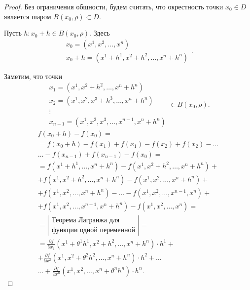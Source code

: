 \begin{proof}
    Без ограничения общности, будем считать, что окрестность точки $ x_0\in D $ является шаром $ B(x_0,\rho)\subset D $.

    Пусть $ h:x_0+h \in B(x_0,\rho) $. Здесь
    \[
        \begin{array}{l}
            x_0 = (x^1,x^2,\ldots,x^n) \\
            x_0 + h = (x^1 + h^1,x^2 + h^2,\ldots,x^n+h^n)
        \end{array}.
    \]

    Заметим, что точки
    \[
        \begin{array}{l}
            x_1 = (x^1,x^2+h^2,\ldots,x^n+h^n)       \\
            x_2 = (x^1,x^2,x^3 + h^3,\ldots,x^n+h^n) \\
            \vdots                                   \\
            x_{n-1} = (x^1,x^2,x^3,\ldots,x^{n-1},x^n+h^n)
        \end{array} \in B(x_0,\rho).
    \]
    \begin{multline*}
        f(x_0 + h) - f(x_0) = \\
        = f(x_0 + h) - f(x_1) + f(x_1) - f(x_2) + f(x_2) - \ldots\\
        \ldots - f(x_{n-1}) + f(x_{n-1}) - f(x_0) = \\
        = f(x^1 + h^1, \ldots,  x^n + h^n) - f(x^1, x^2 + h^2,  \ldots,  x^n + h^n) + \\
        + f(x^1,  x^2 + h^2,  \ldots,  x^n + h^n) - f(x^1,  x^2,  \ldots,  x^n + h^n) + \\
        + f(x^1,  x^2,  \ldots,  x^n + h^n) - \ldots - f(x^1,  x^2,  \ldots,  x^{n-1},  x^n) + \\
        + f(x^1,  x^2,  \ldots,  x^{n-1},  x^n + h^n) - f(x^1,  x^2,  \ldots,  x^n) = \\
        = \left|\begin{array}{c}
            \text{Теорема Лагранжа для} \\
            \text{функции одной переменной}
        \end{array}\right| = \\
        = \frac{\partial f}{\partial x_1}(x^1 + \theta^1 h^1,  x^2 + h^2,  \ldots,  x^n + h^n) \cdot h^1 + \\
        + \frac{\partial f}{\partial x^2}(x^1,  x^2 + \theta^2 h^2,  \ldots,  x^n + h^n) \cdot h^2 + \ldots \\
        \ldots + \frac{\partial f}{\partial x^n}(x^1,  x^2,  \ldots,  x^n + \theta^n h^n) \cdot h^n.
    \end{multline*}


\end{proof}
